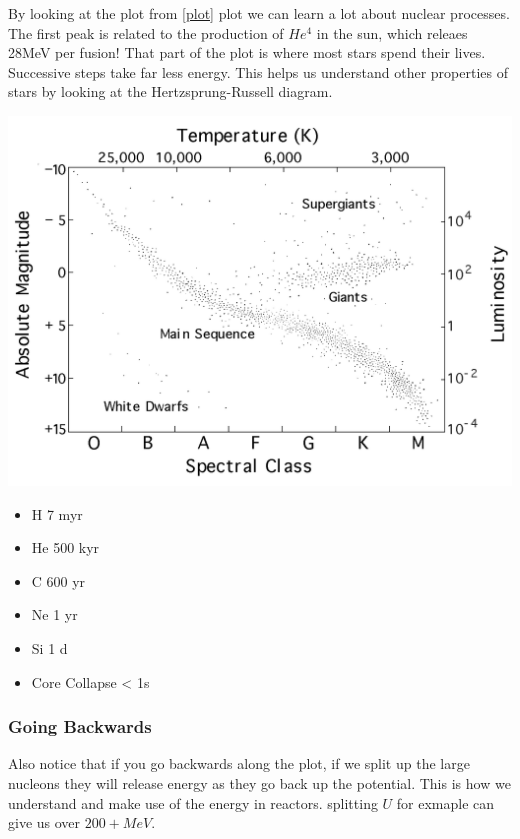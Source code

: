 \documentclass[english, 11pt]{article}
\begin{document}
      By looking at the plot from \ref{plot} plot we can learn a lot about nuclear processes. 
      The first peak is related to the production of $He^{4}$ in the sun, which releaes 28MeV per fusion! That part of the plot is where most stars spend their lives. Successive steps take far less energy. This helps us understand other properties of stars by looking at the Hertzsprung-Russell diagram. 

      \begin{center}\label{rus}
         \includegraphics[scale=0.23]{../img/rus}
      \end{center}

      \begin{itemize}
        \item H 7 myr \
        \item He 500 kyr \
        \item C 600 yr \
        \item Ne 1 yr \
        \item Si 1 d \
        \item Core Collapse < 1s
      \end{itemize}

      \subsubsection*{Going Backwards}

      Also notice that if you go backwards along the plot, if we split up the large nucleons they will release energy as they go back up the potential. This is how we understand and make use of the energy in reactors. splitting $U$ for exmaple can give us over $200+ MeV$. 
\end{document}
